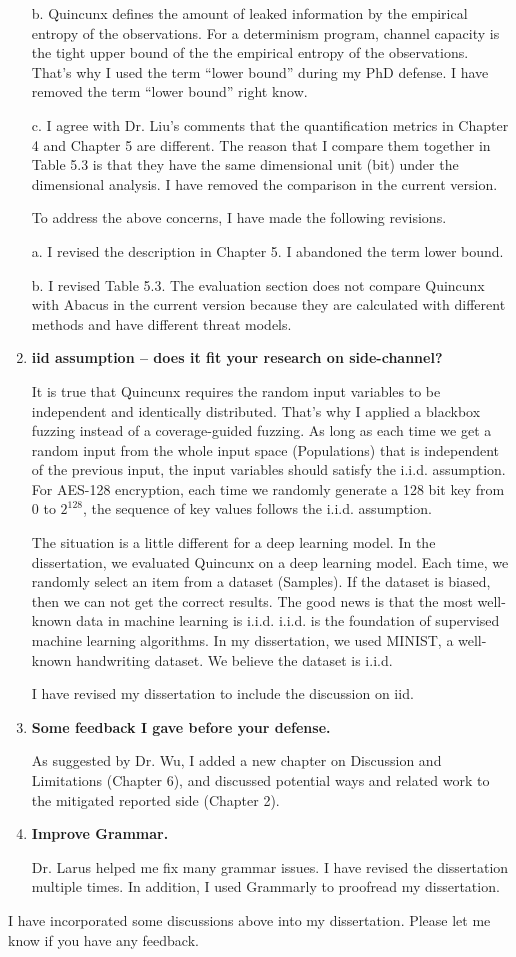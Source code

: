 \documentclass{article}
\begin{document}
\begin{enumerate}
b. Quincunx defines the amount of leaked information by the empirical entropy of the observations. For a determinism program, channel capacity is the tight upper bound of the the empirical entropy of the observations. That's why I used the term ``lower bound'' during my PhD defense. I have removed the term ``lower bound'' right know.

c. I agree with Dr. Liu's comments that the quantification metrics in Chapter 4 and Chapter 5 are different. The reason that I compare them together in Table 5.3 is that they have the same dimensional unit (bit) under the dimensional analysis. I have removed the comparison in the current version.

To address the above concerns, I have made the following revisions.

a. I revised the description in Chapter 5. I abandoned the term lower bound.

b. I revised Table 5.3. The evaluation section does not compare Quincunx with Abacus in the current version because they are calculated with different methods and have different threat models.
\item \textbf{iid assumption – does it fit your research on side-channel?}

It is true that Quincunx requires the random input variables to be independent and identically distributed. That's why I applied a blackbox fuzzing instead of a coverage-guided fuzzing. As long as each time we get a random input from the whole input space (Populations) that is independent of the previous input, the input variables should satisfy the i.i.d. assumption. For AES-128 encryption, each time we randomly generate a 128 bit key from $0$ to $2^{128}$, the sequence of key values follows the i.i.d. assumption.

The situation is a little different for a deep learning model. In the dissertation, we evaluated Quincunx on a deep learning model. Each time, we randomly select an item from a dataset (Samples). If the dataset is biased, then we can not get the correct results. The good news is that the most well-known data in machine learning is i.i.d. i.i.d. is the foundation of supervised machine learning algorithms. In my dissertation, we used MINIST, a well-known handwriting dataset. We believe the dataset is i.i.d.

I have revised my dissertation to include the discussion on iid.


\item \textbf{Some feedback I gave before your defense.}

As suggested by Dr. Wu, I added a new chapter on Discussion and Limitations (Chapter 6), and discussed potential ways and related work to the mitigated reported side (Chapter 2).

\item \textbf{Improve Grammar.}

Dr. Larus helped me fix many grammar issues. I have revised the dissertation multiple times. In addition, I used Grammarly to proofread my dissertation.


\end{enumerate}

I have incorporated some discussions above into my dissertation. Please let me know if you have any feedback.
\end{document}
